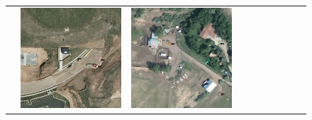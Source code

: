 \begin{figure}[h!]
\begin{tabularx}{\textwidth}{c|*{9}{X}}
    & \includegraphics[trim={440pt 360pt 460pt 555pt},clip,width=\linewidth]{images/015Results/01abb_vs_obb/comp_images/obb/427.png}
    & \includegraphics[trim={740pt 420pt 180pt 510pt},clip,width=\linewidth]{images/015Results/01abb_vs_obb/comp_images/obb/523.png}

\end{tabularx}
\end{figure}
